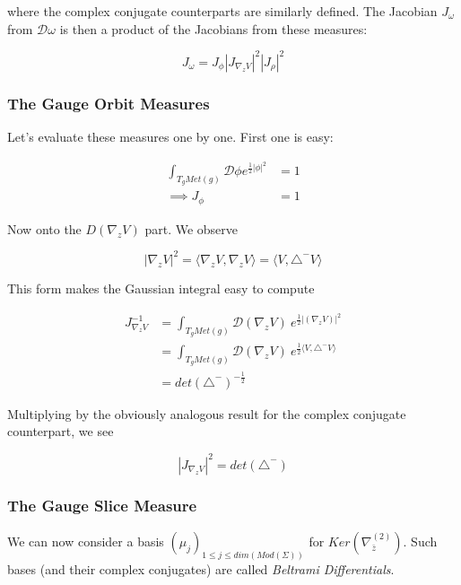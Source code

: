     where the complex conjugate counterparts are similarly defined. The Jacobian $J_\omega$ from $\mathcal D \omega$ is then a product of the Jacobians from these measures:

    \begin{equation}
        J_\omega = J_\phi |J_{\nabla_z V}|^2 |J_\rho|^2
    \end{equation}


\subsubsection{The Gauge Orbit Measures}

    Let's evaluate these measures one by one. First one is easy:

    \begin{align}
         \int_{T_g Met(g)} \mathcal D \phi e^{\frac12 |\phi|^2} &= 1 \\
            \implies J_\phi &= 1
    \end{align}

    Now onto the $D (\nabla_z V)$ part. We observe

    \begin{equation}
        |\nabla_z V|^2 = \langle \nabla_z V, \nabla_z V \rangle = \langle V, \triangle^- V \rangle
    \end{equation}

    This form makes the Gaussian integral easy to compute

    \begin{align}
        J_{\nabla_z V}^{-1} &= \int_{T_g Met(g)} \mathcal D (\nabla_z V) ~ e^{\frac12 |(\nabla_z V)|^2}\\
        &= \int_{T_g Met(g)} \mathcal D (\nabla_z V) ~ e^{\frac12 \langle V, \triangle^- V \rangle}\\
        &= det(\triangle^-)^{-\frac12}
    \end{align}

    Multiplying by the obviously analogous result for the complex conjugate counterpart, we see

    \begin{equation}
        |J_{\nabla_z V}|^2 = det(\triangle^-)
    \end{equation}

\subsubsection{The Gauge Slice Measure}


We can now consider a basis $(\mu_j)_{1 \le j \le dim(Mod(\Sigma))}$ for $Ker(\nabla^{(2)}_{\bar z})$. Such bases (and their complex conjugates) are called \textit{Beltrami Differentials}. 
